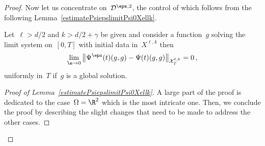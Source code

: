 \begin{proof}
Now let us concentrate on~$ {\mathcal D} ^{\eps,2}$, the control of which follows from the following Lemma~\ref{estimatePsiepslimitPsi0Xellk}.

\begin{lemm}\label{estimatePsiepslimitPsi0Xellk}
Let~$\ell>d/2$ and ${k>d/2+\gamma}$ be given and consider a function~$g$ solving the limit system on~$[0,T]$ with initial data in~$X^{\ell,k}$ then
\[
\lim_{\e \to 0}\left\| \Psi^\eps(t) (g,g)- \Psi(t) (g,g)\right\|_{{\mathcal X}_T^{\ell,k}} = 0\,,
\]
uniformly in~$T$ if~$g$ is a global solution.
\end{lemm}


\begin{proof}[{Proof of Lemma~\ref{estimatePsiepslimitPsi0Xellk}}]
A large part of the proof is dedicated to the case~$\Omega = \R^2$ which is the most intricate one. Then, we conclude the proof by describing the slight changes that need to be made to address the other cases.


\end{proof}
\end{proof}
